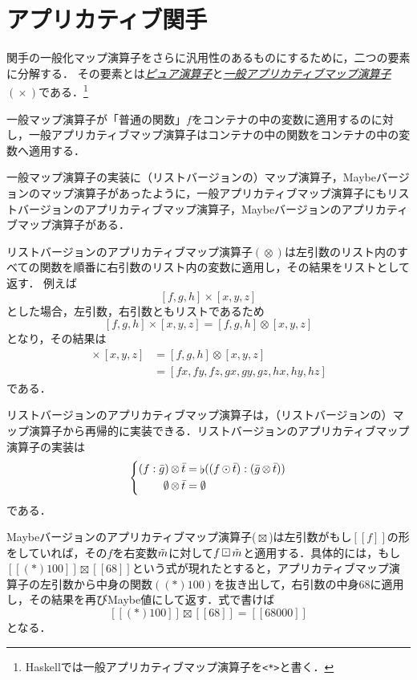 \documentclass[a5paper,draft]{jsbook}
\def\[{\left[\!\left[}
\def\]{\right]\!\right]}
\newcommand{\programminglanguage}[1]{\textsf{#1}}
\newcommand{\haskell}{\programminglanguage{Haskell}}
\newcommand{\keyword}[1]{{\underline{\emph{#1}}}}
\newcommand{\code}[1]{\texttt{#1}}
\newcommand{\mathListVar}[1]{\Bar{#1}}
\DeclareMathOperator{\hsklApplicativeMap}{\times}
\DeclareMathOperator{\hsklApplicativeListMap}{\otimes}
\DeclareMathOperator{\hsklApplicativeMaybeMap}{\boxtimes}
\DeclareMathOperator{\hsklConcat}{\flat}
\DeclareMathOperator{\hsklMap}{\odot}
\DeclareMathOperator{\hsklMaybeMap}{\boxdot}
\newcommand{\hsklEmptyList}{\emptyset}
\newcommand{\hsklJust}[1]{\[#1\]}
\newcommand{\hsklMaybe}[1]{\Tilde{#1}}
\begin{document}
\section{アプリカティブ関手}

関手の一般化マップ演算子をさらに汎用性のあるものにするために，二つの要素に分解する．
その要素とは\keyword{ピュア演算子}と\keyword{一般アプリカティブマップ演算子} $(\hsklApplicativeMap)$である．\footnote{\haskell では一般アプリカティブマップ演算子を\code{<*>}と書く．}

一般マップ演算子が「普通の関数」$f$をコンテナの中の変数に適用するのに対し，一般アプリカティブマップ演算子はコンテナの中の関数をコンテナの中の変数へ適用する．

一般マップ演算子の実装に（リストバージョンの）マップ演算子，Maybeバージョンのマップ演算子があったように，一般アプリカティブマップ演算子にもリストバージョンのアプリカティブマップ演算子，Maybeバージョンのアプリカティブマップ演算子がある．

リストバージョンのアプリカティブマップ演算子$(\hsklApplicativeListMap)$は左引数のリスト内のすべての関数を順番に右引数のリスト内の変数に適用し，その結果をリストとして返す．
例えば$$[f,g,h]\hsklApplicativeMap[x,y,z]$$とした場合，左引数，右引数ともリストであるため$$[f,g,h]\hsklApplicativeMap[x,y,z]=[f,g,h]\hsklApplicativeListMap[x,y,z]$$となり，その結果は
\begin{align*}
[f,g,h]\hsklApplicativeMap[x,y,z]&=[f,g,h]\hsklApplicativeListMap[x,y,z]\\
&=[fx,fy,fz,gx,gy,gz,hx,hy,hz]
\end{align*}
である．

リストバージョンのアプリカティブマップ演算子は，（リストバージョンの）マップ演算子から再帰的に実装できる．リストバージョンのアプリカティブマップ演算子の実装は
\begin{equation}
\left\{
\begin{split}
(f:\mathListVar{g})\hsklApplicativeListMap\mathListVar{t}&=\hsklConcat((f\hsklMap\mathListVar{t}):(\mathListVar{g}\hsklApplicativeListMap\mathListVar{t}))\\
\hsklEmptyList\hsklApplicativeListMap\mathListVar{t}&=\hsklEmptyList
\end{split}
\right.
\end{equation}
である．

Maybeバージョンのアプリカティブマップ演算子($\hsklApplicativeMaybeMap$)は左引数がもし$\hsklJust{f}$の形をしていれば，その$f$を右変数$\hsklMaybe{m}$に対して$f\hsklMaybeMap\hsklMaybe{m}$と適用する．具体的には，もし$\hsklJust{(*)100}\hsklApplicativeMaybeMap{}\hsklJust{68}$という式が現れたとすると，アプリカティブマップ演算子の左引数から中身の関数$((*)100)$を抜き出して，右引数の中身$68$に適用し，その結果を再びMaybe値にして返す．式で書けば$$\hsklJust{(*)100}\hsklApplicativeMaybeMap{}\hsklJust{68}=\hsklJust{68000}$$となる．
\end{document}
